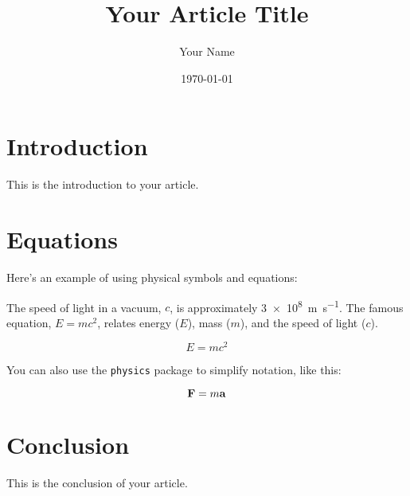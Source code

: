 \documentclass{article}
\title{Your Article Title}
\author{Your Name}
\date{\today}
\begin{document}
\maketitle

\section{Introduction}
This is the introduction to your article.

\section{Equations}
Here's an example of using physical symbols and equations:

The speed of light in a vacuum, \(c\), is approximately \SI{3e8}{\meter\per\second}. 
The famous equation, \(E=mc^2\), relates energy (\(E\)), mass (\(m\)), and the speed of light (\(c\)).

\begin{equation}
    E = mc^2
\end{equation}

You can also use the \texttt{physics} package to simplify notation, like this:

\begin{equation}
    \vb{F} = m \vb{a}
\end{equation}

\section{Conclusion}
This is the conclusion of your article.
\end{document}
